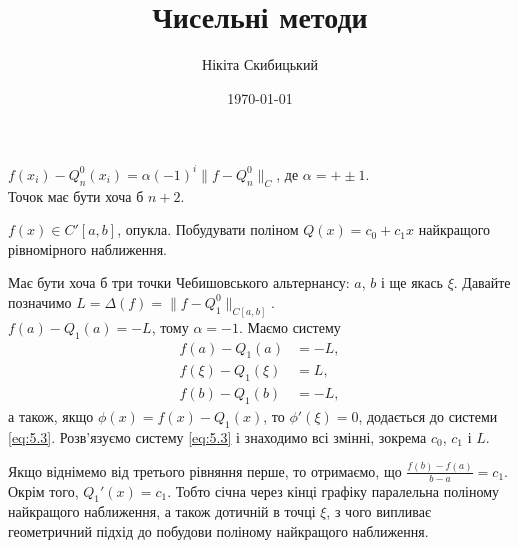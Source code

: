 


\title{Чисельні методи}
\author{Нікіта Скибицький}
\date{\today}



\maketitle

\tableofcontents

\begin{theorem}
	$f(x_i) - 	Q_n^0 (x_i) = \alpha (-1)^i \|f- Q_n^0\|_C$, де
	$\alpha = +\pm 1$. \\

	Точок має бути хоча б $n + 2$.
\end{theorem}

\begin{example}
	$f(x) \in C'[a, b]$, опукла. Побудувати поліном $Q(x) = c_0 + c_1 x$ найкращого рівномірного наближення.
\end{example}

\begin{solution}
	Має бути хоча б три точки Чебишовського альтернансу: $a$, $b$ і ще якась $\xi$. Давайте позначимо $L = \Delta(f) = \|f - Q_1^0\|_{C[a,b]}$. \\

	$f(a) - Q_1(a) = - L$, тому $\alpha = -1$. Маємо систему
	\begin{equation}
		\label{eq:5.3}
		\begin{aligned}
			f(a) - Q_1(a) &= -L, \\
			f(\xi) - Q_1(\xi) &= L, \\
			f(b) - Q_1(b) &= -L,
		\end{aligned}
	\end{equation}
	а також, якщо $\phi(x) = f(x) - Q_1(x)$, то $\phi'(\xi) = 0$, додається до системи \eqref{eq:5.3}. Розв'язуємо систему \eqref{eq:5.3} і знаходимо всі змінні, зокрема $c_0$, $c_1$ і $L$. \\

	\begin{remark}
		Якщо віднімемо від третього рівняння перше, то отримаємо, що $\frac{f(b) - f(a)}{b - a} = c_1$. Окрім того, $Q_1'(x) = c_1$. Тобто січна через кінці графіку паралельна поліному найкращого наближення, а також дотичній в точці $\xi$, з чого випливає геометричний підхід до побудови поліному найкращого наближення.
	\end{remark}
\end{solution}

